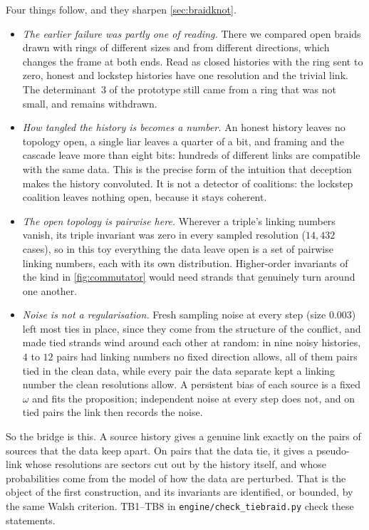 \documentclass[11pt]{article}
\theoremstyle{definition}\newtheorem{definition}[theorem]{Definition}\newtheorem{remark}[theorem]{Remark}\newtheorem{example}[theorem]{Example}\newtheorem{problem}[theorem]{Open problem}\crefname{problem}{Problem}{Problems}
\begin{document}
Four things follow, and they sharpen \cref{sec:braidknot}.
\begin{itemize}
\item \emph{The earlier failure was partly one of reading.} There we compared open braids drawn with rings of different sizes and from different directions, which changes the frame at both ends. Read as closed histories with the ring sent to zero, honest and lockstep histories have one resolution and the trivial link. The determinant~$3$ of the prototype still came from a ring that was not small, and remains withdrawn.
\item \emph{How tangled the history is becomes a number.} An honest history leaves no topology open, a single liar leaves a quarter of a bit, and framing and the cascade leave more than eight bits: hundreds of different links are compatible with the same data. This is the precise form of the intuition that deception makes the history convoluted. It is not a detector of coalitions: the lockstep coalition leaves nothing open, because it stays coherent.
\item \emph{The open topology is pairwise here.} Wherever a triple's linking numbers vanish, its triple invariant was zero in every sampled resolution ($14{,}432$ cases), so in this toy everything the data leave open is a set of pairwise linking numbers, each with its own distribution. Higher-order invariants of the kind in \cref{fig:commutator} would need strands that genuinely turn around one another.
\item \emph{Noise is not a regularisation.} Fresh sampling noise at every step (size $0.003$) left most ties in place, since they come from the structure of the conflict, and made tied strands wind around each other at random: in nine noisy histories, $4$ to $12$ pairs had linking numbers no fixed direction allows, all of them pairs tied in the clean data, while every pair the data separate kept a linking number the clean resolutions allow. A persistent bias of each source is a fixed $\omega$ and fits the proposition; independent noise at every step does not, and on tied pairs the link then records the noise.
\end{itemize}
So the bridge is this. A source history gives a genuine link exactly on the pairs of sources that the data keep apart. On pairs that the data tie, it gives a pseudo-link whose resolutions are sectors cut out by the history itself, and whose probabilities come from the model of how the data are perturbed. That is the object of the first construction, and its invariants are identified, or bounded, by the same Walsh criterion. TB1--TB8 in \texttt{engine/check\_tiebraid.py} check these statements.
\end{document}
